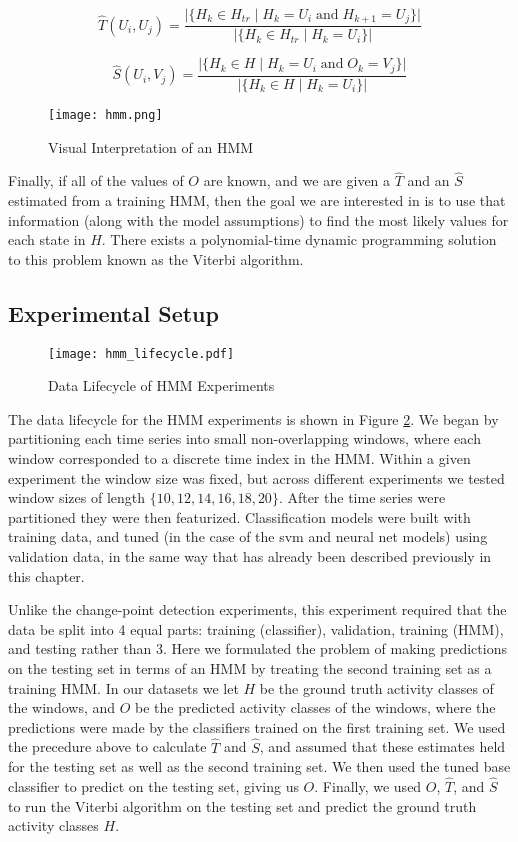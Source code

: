 \[
\hat{T}(U_i,U_j) = \frac{|\{H_k \in H_{tr} \; | \; H_k=U_i \; \text{and} \; H_{k+1}=U_j\}|} {|\{H_k \in H_{tr} \; | \; H_k=U_i\}|}
\]

\[
\hat{S}(U_i,V_j) = \frac{|\{H_k \in H \; | \; H_k=U_i \; \text{and} \; O_k=V_j\}|} {|\{H_k \in H \; | \; H_k=U_i\}|}
\]

\begin{figure}
 \centering
 \texttt{[image: hmm.png]}
 \caption{Visual Interpretation of an HMM}
 \label{fig:hmm}
\end{figure}

Finally, if all of the values of $O$ are known, and we are given
a $\hat{T}$ and an $\hat{S}$ estimated from a training HMM, then the goal we are interested in
is to use that information (along with the model assumptions)
to find the most likely values for each state in $H$. There
exists a polynomial-time dynamic programming solution to this problem known as
the Viterbi algorithm. \cite{russell10}

\subsection{Experimental Setup}

\begin{figure}
 \centering
 \texttt{[image: hmm\_lifecycle.pdf]}
 \caption{Data Lifecycle of HMM Experiments}
 \label{fig:hmm_lifecycle}
\end{figure}

The data lifecycle for the HMM experiments is shown in Figure \ref{fig:hmm_lifecycle}.
We began by partitioning each time series into small non-overlapping windows,
where each window corresponded to a discrete time index in the HMM. Within a
given experiment the window size was fixed, but across different experiments we
tested window sizes of length $\{10, 12, 14, 16, 18, 20\}$. After the time series were
partitioned they were then featurized. Classification models were built with training data,
and tuned (in the case of the svm and neural net models) using validation data,
in the same way that has already been described previously in this chapter.

Unlike the change-point detection experiments, this experiment required
that the data be split into 4 equal parts: training (classifier), validation,
training (HMM), and testing rather than 3. 
Here we formulated the problem of making predictions on the testing set in terms
of an HMM by treating the second training set as a training HMM. In our datasets
we let $H$ be the ground truth activity classes of the windows, and $O$ be the
predicted activity classes of the windows, where the predictions were made by
the classifiers trained on the first training set. We used the precedure above
to calculate $\hat{T}$ and $\hat{S}$, and assumed that these estimates held for
the testing set as well as the second training set. We then used the
tuned base classifier to predict on the testing set, giving us $O$. Finally,
we used $O$, $\hat{T}$, and $\hat{S}$ to run the Viterbi algorithm on the
testing set and predict the ground truth activity classes $H$.
